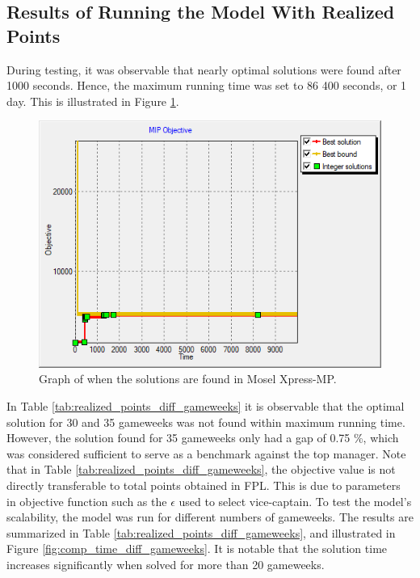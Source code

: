 \subsection{Results of Running the Model With Realized Points}

During testing, it was observable that nearly optimal solutions were found after 1000 seconds. Hence, the maximum running time was set to 86 400 seconds, or 1 day. This is illustrated in Figure \ref{fig:solutions_found_realized_points}. 

\begin{figure}[!htbp]
    \centering
    \includegraphics[scale=0.50]{fig/chapter_7/solution_found_edit_zoom_1.png}
    \caption{Graph of when the solutions are found in Mosel Xpress-MP.}
    \label{fig:solutions_found_realized_points}
\end{figure}


In Table \ref{tab:realized_points_diff_gameweeks} it is observable that the optimal solution for 30 and 35 gameweeks was not found within maximum running time. However, the solution found for 35 gameweeks only had a gap of 0.75 \%, which was considered sufficient to serve as a benchmark against the top manager. Note that in Table \ref{tab:realized_points_diff_gameweeks}, the objective value is not directly transferable to total points obtained in FPL. This is due to parameters in objective function such as the $\epsilon$ used to select vice-captain. To test the model's scalability, the model was run for different numbers of gameweeks. The results are summarized in Table \ref{tab:realized_points_diff_gameweeks}, and illustrated in Figure \ref{fig:comp_time_diff_gameweeks}. It is notable that the solution time increases significantly when solved for more than 20 gameweeks.

